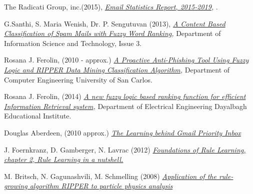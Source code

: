 \documentclass[journal]{IEEEtran}
\begin{document}
\begin{thebibliography}{9}
    The Radicati Group, inc.(2015),
    \textit{
        \href{https://github.com/Menziess/Fuzzy-Logic-Email-Classification/raw/master/report/res/a_new_fuzzy_logic_based_ranking_function_for_efficient_information_retrieval_system.pdf}{Email Statistics Report, 2015-2019},
    }.

    G.Santhi, S. Maria Wenish, Dr. P. Sengutuvan (2013),
    \textit{
        \href{https://github.com/Menziess/Fuzzy-Logic-Email-Classification/raw/master/report/res/a_content_based_classification_of_spam_mails_with_fuzzy_word_ranking.pdf}{A Content Based Classification of Spam Mails with Fuzzy Word Ranking},
    }
    Department of Information Science and Technology,
    Issue 3.

    Rosana J. Ferolin, (2010 - approx.)
    \textit{
        \href{https://github.com/Menziess/Fuzzy-Logic-Email-Classification/raw/master/report/res/a_proactive_anti-phishing_tool_using_fuzzy_logic_and_ripper_data_mining_classification_algorithm.pdf}{A Proactive Anti-Phishing Tool Using Fuzzy Logic and RIPPER Data Mining Classification Algorithm},
    }
    Department of Computer Engineering University of San Carlos.

    Rosana J. Ferolin, (2014)
    \textit{
        \href{https://github.com/Menziess/Fuzzy-Logic-Email-Classification/raw/master/report/res/a_new_fuzzy_logic_based_ranking_function_for_efficient_information_retrieval_system.pdf}{A new fuzzy logic based ranking function for efficient Information Retrieval system},
    }
    Department of Electrical Engineering Dayalbagh Educational Institute.

    Douglas Aberdeen, (2010 approx.)
    \textit{
        \href{[nog toevoegen}{The Learning behind Gmail Priority Inbox}
    }

    J. Foernkranz, D. Gamberger, N. Lavrac (2012)
    \textit{
        \href{[nog toevoegen}{Foundations of Rule Learning, chapter 2, Rule Learning in a nutshell.}
    }

    M. Britsch, N. Gagunashvili, M. Schmelling (2008)
    \textit{
        \href{[nog toevoegen}{Application of the rule-growing algorithm RIPPER to particle physics analysis}
    }

\end{thebibliography}

\newpage
\end{document}
